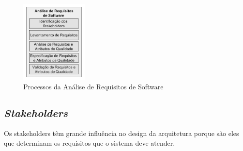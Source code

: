 \documentclass[11pt,a4paper]{article}
\begin{document}
\begin{figure} [h!]
  \centering
    \includegraphics[width=0.3\textwidth]{analisereq}
  \caption{Processos da Análise de Requisitos de Software} 
  \label{fig:analisereq}
\end{figure}

\subsection{\textit{Stakeholders}}
\label{subsec:stakeholders}
Os stakeholders têm grande influência no design da arquitetura porque são eles que determinam
os requisitos que o sistema deve atender.
\end{document}
